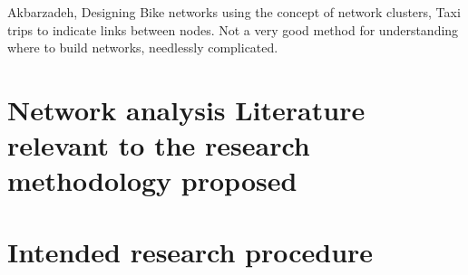 \documentclass[11pt]{article} %
\begin{document}
Akbarzadeh, Designing Bike networks using the concept of network clusters, Taxi trips to indicate links between nodes. Not a very good method for understanding where to build networks, needlessly complicated. \cite{akbarzadeh2018designing}


\cite{boisjoly2019bicycle}

\cite{buehler2016bikeway}

\cite{cabral2019low}

\cite{doorley2019designing}

\cite{duthie2014optimization}

\cite{furth2016network}

\cite{lowry2016prioritizing}

\cite{lowry2017quantifying}

\cite{mauttone2017bicycle}

\cite{mekuria2012low}


\cite{mesbah2012bilevel}


\cite{osama2017models}

\cite{wang2016does}








\section{Network analysis Literature relevant to the research methodology proposed}

\cite{}

\cite{}










\section{Intended research procedure}





\end{document}
